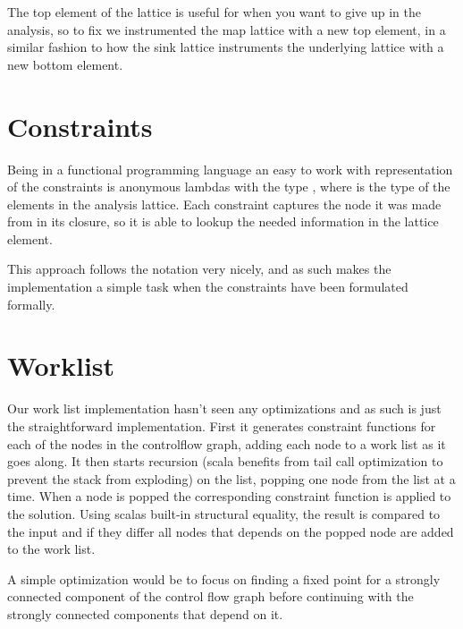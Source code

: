 The top element of the lattice is useful for when you want to give up in the analysis, so to fix we instrumented the map lattice with a new top element, 
in a similar fashion to how the sink lattice instruments the underlying lattice with a new bottom element. 

\section{Constraints}

Being in a functional programming language an easy to work with representation of the constraints is anonymous lambdas with the type , 
where  is the type of the elements in the analysis lattice. Each constraint captures the node it was made from in its closure, 
so it is able to lookup the needed information in the lattice element.

This approach follows the notation very nicely, and as such makes the implementation a simple task when the constraints have been formulated formally.

\section{Worklist}
Our work list implementation hasn't seen any optimizations and as such is just the straightforward implementation. First it generates constraint functions for each of the nodes in the controlflow graph, adding each node to a work list as it goes along. It then starts recursion (scala benefits from tail call optimization to prevent the stack from exploding) on the list, popping one node from the list at a time. When a node is popped the corresponding constraint function is applied to the solution. Using scalas built-in structural equality, the result is compared to the input and if they differ all nodes that depends on the popped node are added to the work list.

A simple optimization would be to focus on finding a fixed point for a strongly connected component of the control flow graph before continuing with the strongly connected components that depend on it.


